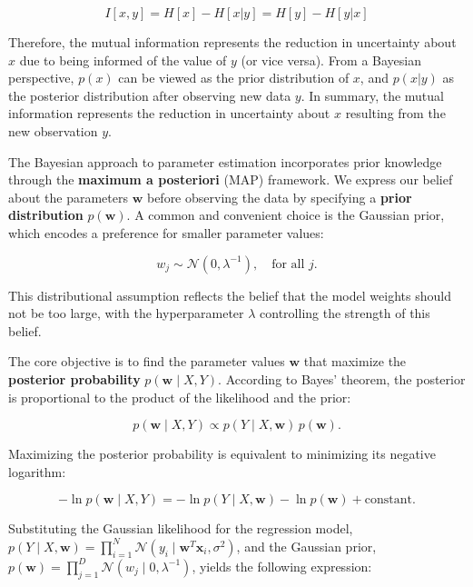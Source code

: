 \documentclass[../main.tex]{subfiles}
\begin{document}
\begin{equation*}
I[x,y] = H[x] - H[x|y] = H[y] - H[y|x]
\tag{2.110}
\end{equation*}

Therefore, the mutual information represents the reduction in uncertainty about $x$ due to being informed of the value of $y$ (or vice versa). From a Bayesian perspective, $p(x)$ can be viewed as the prior distribution of $x$, and $p(x|y)$ as the posterior distribution after observing new data $y$. In summary, the mutual information represents the reduction in uncertainty about $x$ resulting from the new observation $y$.

The Bayesian approach to parameter estimation incorporates prior knowledge through the \textbf{maximum a posteriori} (MAP) framework. We express our belief about the parameters $\mathbf{w}$ before observing the data by specifying a \textbf{prior distribution} $p(\mathbf{w})$. A common and convenient choice is the Gaussian prior, which encodes a preference for smaller parameter values:

\begin{equation*}
w_j \sim \mathcal{N}(0, \lambda^{-1}), \quad \text{for all } j.
\end{equation*}

This distributional assumption reflects the belief that the model weights should not be too large, with the hyperparameter $\lambda$ controlling the strength of this belief.

The core objective is to find the parameter values $\mathbf{w}$ that maximize the \textbf{posterior probability} $p(\mathbf{w} \mid X, Y)$. According to Bayes' theorem, the posterior is proportional to the product of the likelihood and the prior:

\begin{equation*}
p(\mathbf{w} \mid X, Y) \propto p(Y \mid X, \mathbf{w}) \, p(\mathbf{w}).
\end{equation*}

Maximizing the posterior probability is equivalent to minimizing its negative logarithm:

\begin{equation*}
-\ln p(\mathbf{w} \mid X, Y) = -\ln p(Y \mid X, \mathbf{w}) - \ln p(\mathbf{w}) + \text{constant}.
\end{equation*}

Substituting the Gaussian likelihood for the regression model, $p(Y \mid X, \mathbf{w}) = \prod_{i=1}^N \mathcal{N}(y_i \mid \mathbf{w}^T \mathbf{x}_i, \sigma^2)$, and the Gaussian prior, $p(\mathbf{w}) = \prod_{j=1}^D \mathcal{N}(w_j \mid 0, \lambda^{-1})$, yields the following expression:
\end{document}

